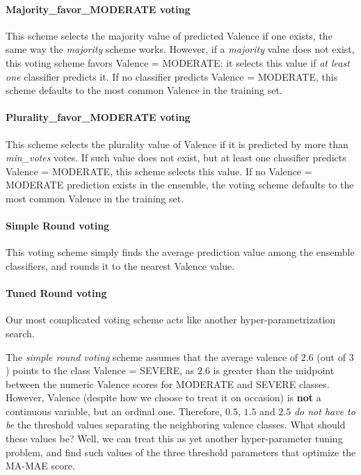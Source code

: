 \paragraph{Majority\_favor\_MODERATE voting} 
This scheme selects the majority
value of predicted \textsf{Valence} if one exists, 
the same way the \textit{majority} scheme works.
However, if a \textit{majority} value does not exist, this voting
scheme favors \textsf{Valence = MODERATE}: it selects this value if \textit{at least one}
classifier predicts it. If no classifier predicts \textsf{Valence = MODERATE}, 
this scheme defaults to the most common \textsf{Valence} in the training set.

\paragraph{Plurality\_favor\_MODERATE voting} 
This scheme selects
the plurality value of \textsf{Valence} if it is predicted by more than
\textit{min\_votes} votes. If such value does not exist, but at least
one classifier predicts \textsf{Valence = MODERATE}, this scheme selects this value.
If no \textsf{Valence = MODERATE} prediction exists in the ensemble, 
the voting scheme defaults to the most common \textsf{Valence} in the training set.

\paragraph{Simple Round voting}  This voting scheme simply finds
the average prediction value among the ensemble classifiers,
and rounds it to the nearest \textsf{Valence} value.

\paragraph{Tuned Round voting}

Our most complicated voting scheme acts like another hyper-parametrization search.

The \textit{simple round voting} scheme assumes that the average valence of $2.6$ (out of $3$) points to the class \textsf{Valence = SEVERE},
as $2.6$ is greater than the midpoint between the numeric \textsf{Valence} scores for
\textsf{MODERATE} and \textsf{SEVERE} classes. However, \textsf{Valence} (despite
how we choose to treat it on occasion) is \textbf{not} a continuous variable, but
an ordinal one.  Therefore, $0.5$, $1.5$ and $2.5$ \textit{do not have to be} the threshold
values separating the neighboring valence classes.  What should these values be?
Well, we can treat this as yet another hyper-parameter tuning problem, and find
such values of the three threshold parameters that optimize the \textsf{MA-MAE} score.

